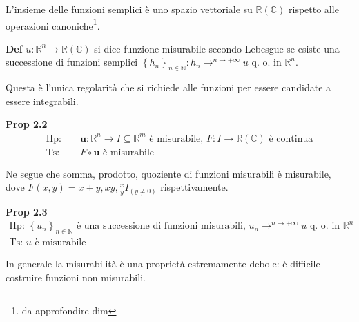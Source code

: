\documentclass{article}
\begin{document}
L'insieme delle funzioni semplici \`{e} uno spazio vettoriale su $%
\mathbb{R}
\left( 
\mathbb{C}
\right) $ rispetto alle operazioni canoniche\footnote{%
da approfondire dim}.

\textbf{Def} $u:%
\mathbb{R}
^{n}\rightarrow 
\mathbb{R}
\left( 
\mathbb{C}
\right) $ si dice funzione misurabile secondo Lebesgue se esiste una
successione di funzioni semplici $\left\{ h_{n}\right\} _{n\in 
\mathbb{N}
}:h_{n}\rightarrow ^{n\rightarrow +\infty }u$ q. o. in $%
\mathbb{R}
^{n}$.

Questa \`{e} l'unica regolarit\`{a} che si richiede alle funzioni per essere
candidate a essere integrabili.

\textbf{Prop 2.2}%
\begin{eqnarray*}
\text{Hp}\text{: } &&\mathbf{u}:%
\mathbb{R}
^{n}\rightarrow I\subseteq 
\mathbb{R}
^{m}\text{ \`{e} misurabile, }F:I\rightarrow 
\mathbb{R}
\left( 
\mathbb{C}
\right) \text{ \`{e} continua} \\
\text{Ts}\text{: } &&F\circ \mathbf{u}\text{ \`{e} misurabile}
\end{eqnarray*}

Ne segue che somma, prodotto, quoziente di funzioni misurabili \`{e}
misurabile, dove $F\left( x,y\right) =x+y,xy,\frac{x}{y}I_{\left( y\neq
0\right) }$ rispettivamente.

\textbf{Prop 2.3}%
\begin{gather*}
\text{Hp}\text{: }\left\{ u_{n}\right\} _{n\in 
\mathbb{N}
}\text{ \`{e} una successione di funzioni misurabili, }u_{n}\rightarrow
^{n\rightarrow +\infty }u\text{ q. o. in }%
\mathbb{R}
^{n} \\
\text{Ts}\text{: }u\text{ \`{e} misurabile}
\end{gather*}

In generale la misurabilit\`{a} \`{e} una propriet\`{a} estremamente debole: 
\`{e} difficile costruire funzioni non misurabili.
\end{document}
